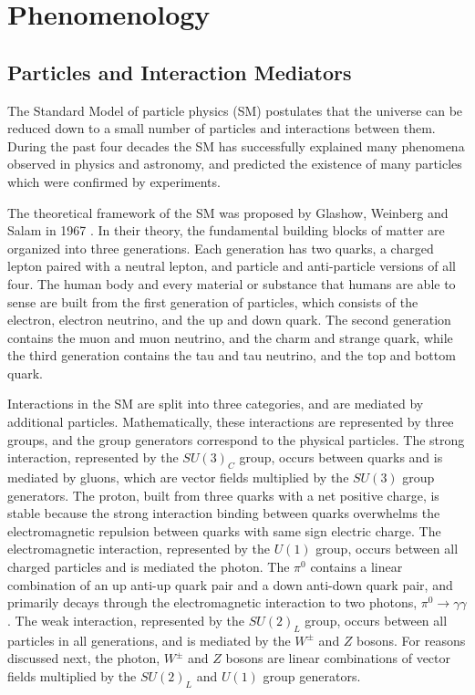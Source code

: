 \chapter{Phenomenology}
\label{wrBosonAndHeavyNu}
\section{Particles and Interaction Mediators}
The Standard Model of particle physics (SM) postulates that the universe can be reduced down to a small 
number of particles and interactions between them.  During the past four decades the SM has successfully 
explained many phenomena observed in physics and astronomy, and predicted the existence of many particles 
which were confirmed by experiments.

The theoretical framework of the SM was proposed by Glashow, Weinberg and Salam in 1967 \cite{weinbergSM,salamSM}.  
In their theory, the fundamental building blocks of matter are organized into three generations.  Each 
generation has two quarks, a charged lepton paired with a neutral lepton, and particle and anti-particle 
versions of all four.  The human body and every material or substance that humans are able to sense are 
built from the first generation of particles, which consists of the electron, electron neutrino, and 
the up and down quark.  The second generation contains the muon and muon neutrino, and the charm and 
strange quark, while the third generation contains the tau and tau neutrino, and the top and bottom 
quark.

Interactions in the SM are split into three categories, and are mediated by additional particles.  Mathematically, 
these interactions are represented by three groups, and the group generators correspond to the physical 
particles.  The strong interaction, represented by the $SU(3)_{C}$ group, occurs between quarks and 
is mediated by gluons, which are vector fields multiplied by the $SU(3)$ group generators.  The proton, 
built from three quarks with a net positive charge, is stable because the strong interaction binding 
between quarks overwhelms the electromagnetic repulsion between quarks with same sign electric charge.  
The electromagnetic interaction, represented by the $U(1)$ group, occurs between all charged particles 
and is mediated the photon.  The $\pi^{0}$ contains a linear combination of an up anti-up quark pair and 
a down anti-down quark pair, and primarily decays through the electromagnetic interaction to two photons, 
$\pi^{0} \rightarrow \gamma\gamma$.  The weak  interaction, represented by the $SU(2)_{L}$ group, occurs 
between all particles in all generations, and is mediated by the $W^{\pm}$ and $Z$ bosons.  For reasons 
discussed next, the photon, $W^{\pm}$ and $Z$ bosons are linear combinations of vector fields multiplied 
by the $SU(2)_{L}$ and $U(1)$ group generators.

